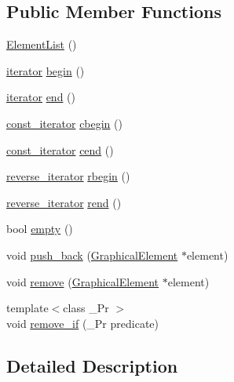\subsection*{Public Member Functions}
\begin{DoxyCompactItemize}
\item 
\hyperlink{class_element_list_ae2d7329bdbfaf1f8dcb864776ee6de9b}{Element\+List} ()
\item 
\hyperlink{class_element_list_a10e1b0c17ebe441fcd035fcf0a00d25e}{iterator} \hyperlink{class_element_list_abd034ccb887a4cccedb6906e2b516a99}{begin} ()
\item 
\hyperlink{class_element_list_a10e1b0c17ebe441fcd035fcf0a00d25e}{iterator} \hyperlink{class_element_list_a7e5dfdae6a16e385bbdd1564fd5cf200}{end} ()
\item 
\hyperlink{class_element_list_a4323074a8e979322c0bf1eed5c892cf4}{const\+\_\+iterator} \hyperlink{class_element_list_a11b3b63aad29b085b5d77e2e623d6bb4}{cbegin} ()
\item 
\hyperlink{class_element_list_a4323074a8e979322c0bf1eed5c892cf4}{const\+\_\+iterator} \hyperlink{class_element_list_a67ed451811a28e5d94edd286b8a1f245}{cend} ()
\item 
\hyperlink{class_element_list_a5a94d1e25a0deeb3f222dc12fa115174}{reverse\+\_\+iterator} \hyperlink{class_element_list_a827726e626667715db21ad21f1b7d6fa}{rbegin} ()
\item 
\hyperlink{class_element_list_a5a94d1e25a0deeb3f222dc12fa115174}{reverse\+\_\+iterator} \hyperlink{class_element_list_a5c77af44a070ae80cddef7ce161e2f8b}{rend} ()
\item 
bool \hyperlink{class_element_list_aff93ee82e54aa171e792b0a86cafd08a}{empty} ()
\item 
void \hyperlink{class_element_list_a0c7327348fe7c7d8ad032ad4a71eed39}{push\+\_\+back} (\hyperlink{class_graphical_element}{Graphical\+Element} $\ast$element)
\item 
void \hyperlink{class_element_list_a06b71e09b7ca85b416effbdac076ec49}{remove} (\hyperlink{class_graphical_element}{Graphical\+Element} $\ast$element)
\item 
{\footnotesize template$<$class \+\_\+\+Pr $>$ }\\void \hyperlink{class_element_list_aa851e6d5b10920f2541d3dc0f5f2ee57}{remove\+\_\+if} (\+\_\+\+Pr predicate)
\end{DoxyCompactItemize}


\subsection{Detailed Description}



